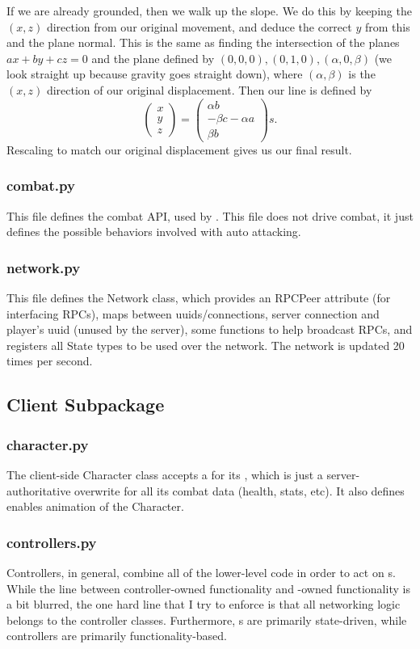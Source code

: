 \documentclass{article}
\begin{document}
If we are already grounded, then we walk up the slope. We do this by keeping
the $(x, z)$ direction from our original movement, and deduce the correct
$y$ from this and the plane normal. This is the same as finding the
intersection of the planes $ax + by + cz = 0$ and the plane defined by
$(0, 0, 0), (0, 1, 0), (\alpha, 0, \beta)$ (we look straight up because gravity goes
straight down), where $(\alpha, \beta)$ is the $(x, z)$ direction of our
original displacement. Then our line is defined by
\[
\begin{pmatrix}
    x\\y\\z
\end{pmatrix} = 
\begin{pmatrix}
    \alpha b\\-\beta c - \alpha a\\\beta b
\end{pmatrix}s.\]
Rescaling to match our original displacement gives us our final result.
\subsubsection{combat.py}
This file defines the combat API, used by . This file does not
drive combat, it just defines the possible behaviors involved with auto attacking.

\subsubsection{network.py}
This file defines the Network class, which provides an RPCPeer attribute (for interfacing
RPCs), maps between uuids/connections, server connection and player's uuid (unused by
the server), some functions to help broadcast RPCs, and registers all State types to
be used over the network. The network is updated 20 times per second.

\subsection{Client Subpackage}
\subsubsection{character.py}
The client-side Character class accepts a  for its ,
which is just a server-authoritative overwrite for all its combat data (health, stats, etc).
It also defines enables animation of the Character.
\subsubsection{controllers.py}
Controllers, in general, combine all of the lower-level code in order to act on s.
While the line between controller-owned functionality and -owned functionality
is a bit blurred, the one hard line that I try to enforce is that all networking logic belongs
to the controller classes. Furthermore, s are primarily state-driven, while
controllers are primarily functionality-based. 
\end{document}
